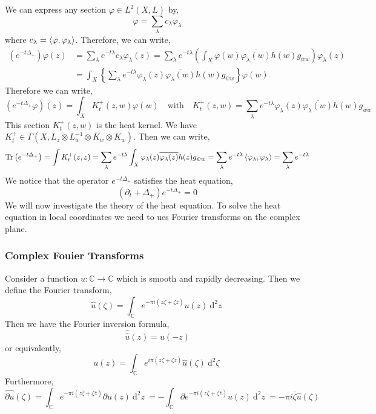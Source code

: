 \documentclass[12pt]{extarticle}
\newcommand{\C}{\mathbb{C}}
\newcommand{\Tr}[1]{\mathrm{Tr}\left( #1 \right)}
\newcommand{\dn}[2]{\: \mathrm{d}^{#1} #2 \:}
\theoremstyle{definition}
\begin{document}
We can express any section $\varphi \in L^2(X, L)$ by,
\[ \varphi = \sum_{\lambda} c_{\lambda} \varphi_{\lambda} \]
where $c_{\lambda} = \left< \varphi, \varphi_{\lambda} \right>$. Therefore, we can write,
\begin{align*}
(e^{- t \Delta_{+}} ) \varphi(z) & = \sum_{\lambda} e^{- t \lambda} c_{\lambda} \varphi_{\lambda}(z) = \sum_{\lambda} e^{- t \lambda} \left( \int_X \varphi(w) \overline{\varphi_{\lambda}(w)} h(w) g_{\bar{w} w} \right) \varphi_{\lambda}(z)
\\
& = \int_X \left\{ \sum_{\lambda} e^{- t \lambda} \varphi_{\lambda}(z) \overline{\varphi_{\lambda}(w)} h(w) g_{\bar{w} w} \right\} \varphi(w) 
\end{align*}
Therefore we can write,
\[ (e^{-t \Delta_{+}} \varphi)(z) = \int_X K^{+}_t(z, w) \varphi(w) \quad \text{with} \quad K^{+}_t(z, w) = \sum_{\lambda} e^{- t \lambda} \varphi_{\lambda}(z) \overline{\varphi_{\lambda}(w)} h(w) g_{\bar{w} w} \]
This section $K^{+}_t(z, w)$ is the heat kernel. We have $K^{+}_t \in \Gamma(X, L_z \otimes L^{-1}_w \otimes \bar{K}_w \otimes K_w)$. Then we can write,
\[ \Tr{e^{- t \Delta_+}} = \int K_t^{+}(z,z) =  \sum_{\lambda} e^{- t \lambda} \int_X  \varphi_{\lambda}(z) \overline{\varphi_{\lambda}(z)} h(z) g_{\bar{w} w} = \sum_{\lambda} e^{- t \lambda} \inner{\varphi_{\lambda}}{\varphi_{\lambda}} = \sum_{\lambda} e^{- t \lambda} \]
We notice that the operator $e^{- t \Delta_+}$ satisfies the heat  equation,
\[ (\partial_t + \Delta_{+}) e^{- t \Delta_{+}} = 0 \]
We will now investigate the theory of the heat equation. To solve the heat equation in local coordinates we need to ues Fourier transforms on the complex plane.

\subsubsection{Complex Fouier Transforms}

Consider a function $u : \C \to \C$ which is smooth and rapidly decreasing. Then we define the Fourier transform,
\[ \hat{u}(\zeta) = \int_{\C} e^{- \pi i (z \bar{\zeta} + \zeta \bar{z}) } u(z) \dn{2}{z} \]
Then we have the Fourier inversion formula,
\[ \hat{\hat{u}}(z) = u(-z) \]
or equivalently,
\[ u(z) = \int_{\C} e^{i \pi (z \bar{\zeta} + \zeta \bar{z})} \hat{u}(\zeta) \dn{2}{\zeta} \]
Furthermore,
\[ \widehat{\partial u}(\zeta) = \int_{\C} e^{- \pi i (z \bar{\zeta} + \zeta \bar{z}) } \partial u(z) \dn{2}{z} = - \int_{\C} \partial e^{- \pi i (z \bar{\zeta} + \zeta \bar{z}) } u(z) \dn{2}{z} = - \pi i \bar{\zeta} \hat{u}(\zeta) \]
\end{document}
